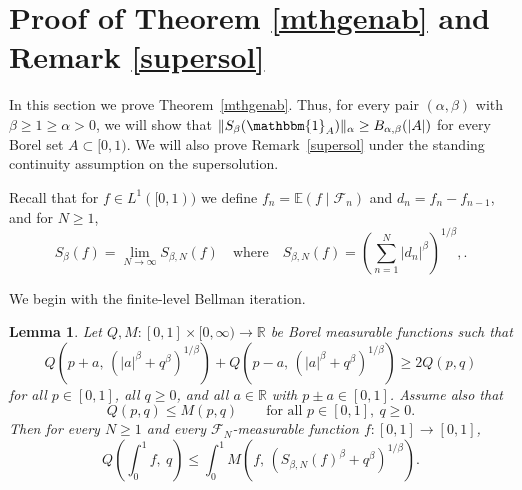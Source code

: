 \documentclass[11pt]{amsart}
\newtheorem{lemma}[theorem]{Lemma}
\theoremstyle{definition}
\renewcommand{\1}{{\mathbbm{1}}}
\begin{document}
\section{Proof of Theorem \ref{mthgenab} and Remark \ref{supersol}}
\label{sec:proof-mthgenab}

In this section we prove Theorem~\ref{mthgenab}. Thus, for every pair $(\alpha,\beta)$ with $\beta\ge 1\ge \alpha>0$, we will show that $\|S_\beta(\mathbbm{1}_A)\|_\alpha \ge B_{\alpha,\beta}(|A|)$ for every Borel set $A\subset{[0,1)}$. We will also prove
Remark~\ref{supersol} under the standing continuity assumption on the
supersolution.

Recall that for $f\in {L^1([0,1))}$ we define $f_n=\mathbb E(f\mid\mathcal F_n)$ and $d_n=f_n-f_{n-1}$, and for $N\ge1$,
\[
S_\beta(f)=\lim_{N\to\infty} S_{\beta,N}(f)
\quad 
\text{where}
\quad
S_{\beta,N}(f)=\left(\sum_{n=1}^N |d_n|^\beta\right)^{1/\beta},
.
\]

We begin with the finite-level Bellman iteration.

\begin{lemma}\label{lem:51}
Let $Q,M:[0,1]\times[0,\infty)\to\mathbb R$ be Borel measurable
functions such that
\begin{equation}\label{eq:3pi}
Q\!\left(p+a,\,(|a|^\beta+q^\beta)^{1/\beta}\right)
+
Q\!\left(p-a,\,(|a|^\beta+q^\beta)^{1/\beta}\right)
\ge 2Q(p,q)
\end{equation}
for all $p\in[0,1]$, all $q\ge0$, and all $a\in\mathbb R$ with
$p\pm a\in[0,1]$. Assume also that
\[
Q(p,q)\le M(p,q)
\qquad \text{for all } p\in[0,1],\ q\ge0.
\]
Then for every $N\ge1$ and every $\mathcal F_N$-measurable function
$f:[0,1]\to[0,1]$,
\begin{equation}\label{eq:finite-level-bellman}
Q\!\left(\int_0^1 f,\ q\right)
\le
\int_0^1
M\!\left(f,\,(S_{\beta,N}(f)^\beta+q^\beta)^{1/\beta}\right).
\end{equation}
\end{lemma}
\end{document}
